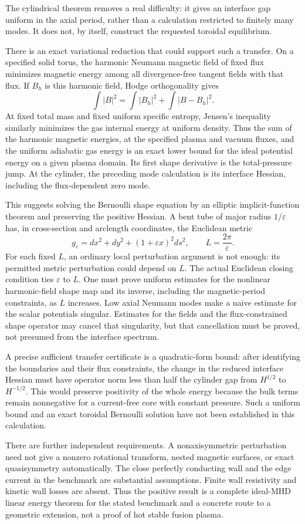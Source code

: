 The cylindrical theorem removes a real difficulty: it gives an
interface gap uniform in the axial period, rather than a calculation
restricted to finitely many modes.  It does not, by itself, construct
the requested toroidal equilibrium.

There is an exact variational reduction that could support such a
transfer.  On a specified solid torus, the harmonic Neumann magnetic
field of fixed flux minimizes magnetic energy among all divergence-free
tangent fields with that flux.  If $B_h$ is this harmonic field, Hodge
orthogonality gives
\[
 \int |B|^2=\int|B_h|^2+\int|B-B_h|^2.
\]
At fixed total mass and fixed uniform specific entropy, Jensen's
inequality similarly minimizes the gas internal energy at uniform
density.  Thus the sum of the harmonic magnetic energies, at the
specified plasma and vacuum fluxes, and the uniform adiabatic gas
energy is an exact lower bound for the ideal potential energy on a
given plasma domain.  Its first shape derivative is the total-pressure
jump.  At the cylinder, the preceding mode calculation is its
interface Hessian, including the flux-dependent zero mode.

This suggests solving the Bernoulli shape equation by an elliptic
implicit-function theorem and preserving the positive Hessian.  A
bent tube of major radius $1/\varepsilon$ has, in cross-section and
arclength coordinates, the Euclidean metric
\[
 g_\varepsilon=dx^2+dy^2+(1+\varepsilon x)^2ds^2,
 \qquad L=\frac{2\pi}{\varepsilon}.
\]
For each fixed $L$, an ordinary local perturbation argument is not
enough: its permitted metric perturbation could depend on $L$.
The actual Euclidean closing condition ties $\varepsilon$ to $L$.
One must prove uniform estimates for the nonlinear harmonic-field
shape map and its inverse, including the magnetic-period constraints,
as $L$ increases.  Low axial Neumann modes make a naive estimate for
the scalar potentials singular.  Estimates for the fields and the
flux-constrained shape operator may cancel that singularity, but that
cancellation must be proved, not presumed from the interface spectrum.

A precise sufficient transfer certificate is a quadratic-form bound:
after identifying the boundaries and their flux constraints, the
change in the reduced interface Hessian must have operator norm less
than half the cylinder gap from $H^{1/2}$ to $H^{-1/2}$.  This would
preserve positivity of the whole energy because the bulk terms remain
nonnegative for a current-free core with constant pressure.  Such a
uniform bound and an exact toroidal Bernoulli solution have not been
established in this calculation.

There are further independent requirements.  A nonaxisymmetric
perturbation need not give a nonzero rotational transform, nested
magnetic surfaces, or exact quasisymmetry automatically.  The close
perfectly conducting wall and the edge current in the benchmark are
substantial assumptions.  Finite wall resistivity and kinetic wall
losses are absent.  Thus the positive result is a complete ideal-MHD
linear energy theorem for the stated benchmark and a concrete route
to a geometric extension, not a proof of hot stable fusion plasma.
